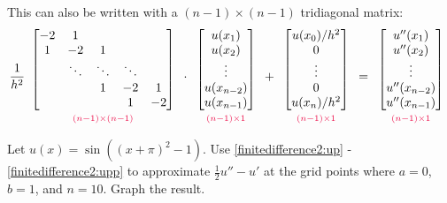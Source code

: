\noindent This can also be written with a $(n-1)\times(n-1)$ tridiagonal matrix:
\begin{align}
\frac{1}{h^2}
\begin{array}{c}
\begin{bmatrix}
-2 & 1 & \\
1 & -2 & 1  \\
& \ddots & \ddots & \ddots \\
& & 1 & -2 & 1 \\
& & & 1 & -2
\end{bmatrix}\\
{\scriptstyle\textcolor{red}{(n-1)\times(n-1)}}
\end{array}\cdot
\begin{array}{c}
\begin{bmatrix}
u(x_1) \\ u(x_2)\\ \vdots  \\ u(x_{n-2}) \\ u(x_{n-1})
\end{bmatrix}\\
{\scriptstyle\textcolor{red}{(n-1)\times1}}
\end{array} +
\begin{array}{c}
\begin{bmatrix}
u(x_0)/h^2 \\ 0 \\ \vdots  \\ 0 \\ u(x_n)/h^2
\end{bmatrix}\\
{\scriptstyle\textcolor{red}{(n-1)\times1}}
 \end{array} =
 \begin{array}{c}
\begin{bmatrix}
u''(x_1) \\ u''(x_2)\\ \vdots  \\ u''(x_{n-2}) \\ u''(x_{n-1})
\end{bmatrix}\\
{\scriptstyle\textcolor{red}{(n-1)\times1}}
\label{finitedifference2:upp}
\end{array}
\end{align}

\begin{problem}
	Let $u(x) = \sin((x+\pi)^2-1)$. Use \eqref{finitedifference2:up} - \eqref{finitedifference2:upp} to approximate $\frac{1}{2}u'' - u'$ at the grid points where $a=0$, $b=1$, and $n=10$. Graph the result.
\end{problem}

